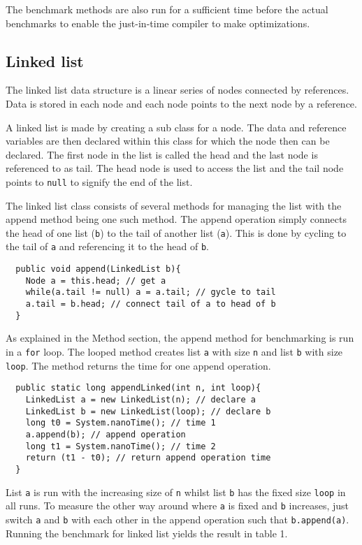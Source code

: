 \documentclass[a4paper,11pt]{article}
\begin{document}
The benchmark methods are also run for a sufficient time before the 
actual benchmarks to enable the just-in-time compiler to make 
optimizations.

\subsection*{Linked list}

The linked list data structure is a linear series of nodes connected by 
references. Data is stored in each node and each node points to the 
next node by a reference.

A linked list is made by creating a sub class for a node. The data and 
reference variables are then declared within this class for which the 
node then can be declared. The first node in the list is called the 
head and the last node is referenced to as tail. The head node is used 
to access the list and the tail node points to {\tt null} to signify 
the end of the list.

The linked list class consists of several methods for managing the list
with the append method being one such method. The append operation 
simply connects the head of one list ({\tt b}) to the tail of another 
list ({\tt a}). This is done by cycling to the tail of {\tt a} and 
referencing it to the head of {\tt b}.

\begin{verbatim}
  public void append(LinkedList b){
    Node a = this.head; // get a
    while(a.tail != null) a = a.tail; // gycle to tail
    a.tail = b.head; // connect tail of a to head of b
  }
\end{verbatim}

As explained in the Method section, the append method for benchmarking 
is run in a {\tt for} loop. The looped method creates list {\tt a} with
size {\tt n} and list {\tt b} with size {\tt loop}. The method returns
the time for one append operation.

\begin{verbatim}
  public static long appendLinked(int n, int loop){
    LinkedList a = new LinkedList(n); // declare a
    LinkedList b = new LinkedList(loop); // declare b
    long t0 = System.nanoTime(); // time 1
    a.append(b); // append operation
    long t1 = System.nanoTime(); // time 2
    return (t1 - t0); // return append operation time
  }
\end{verbatim}

List {\tt a} is run with the increasing size of {\tt n} whilst list
{\tt b} has the fixed size {\tt loop} in all runs. To measure the 
other way around where {\tt a} is fixed and {\tt b} increases, just 
switch {\tt a} and {\tt b} with each other in the append operation 
such that {\tt b.append(a)}. Running the benchmark for linked list 
yields the result in table 1.
\end{document}
